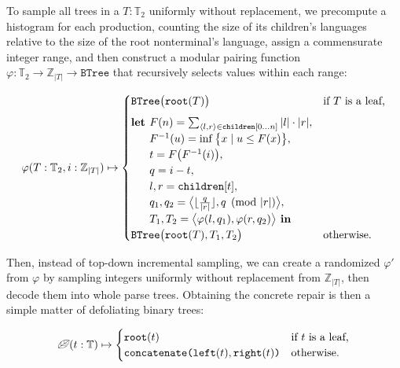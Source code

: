 \documentclass[sigplan,acmsmall,nonacm,screen]{acmart}\settopmatter{printfolios=false,printccs=false,printacmref=false}
\begin{document}
To sample all trees in a $T: \mathbb{T}_2$ uniformly without replacement, we precompute a histogram for each production, counting the size of its children's languages relative to the size of the root nonterminal's language, assign a commensurate integer range, and then construct a modular pairing function $\varphi: \mathbb{T}_2 \rightarrow \mathbb{Z}_{|T|} \rightarrow \texttt{BTree}$ that recursively selects values within each range:

\begin{equation}\label{eq:pairing}
  \varphi(T: \mathbb{T}_2, i: \mathbb{Z}_{|T|}) \mapsto \begin{cases}
  \texttt{BTree}\big(\texttt{root}(T)\big) & \text{if $T$ is a leaf,} \vspace{5pt}\\
  \textbf{let } F(n) = \sum_{\langle l, r\rangle \in \texttt{children}[0 \ldots n]}|l|\cdot|r|,\\
  \phantom{\textbf{let }} F^{-1}(u) = \inf \big\{x \mid u \leq F(x)\big\},\\
  \phantom{\textbf{let }} t = F\big(F^{-1}(i)\big),\\
  \phantom{\textbf{let }} q = i - t,\\
  \phantom{\textbf{let }} l, r = \texttt{children}[t],\\
  \phantom{\textbf{let }} q_1, q_2 = \big\langle\lfloor\frac{q}{|r|}\rfloor, q \pmod{|r|}\big\rangle,\\
  \phantom{\textbf{let }} T_1, T_2 = \big\langle\varphi(l, q_1), \varphi(r, q_2)\big\rangle \textbf{ in } \\
  \texttt{BTree}\big(\texttt{root}(T), T_1, T_2\big) & \text{otherwise.} \\
  \end{cases}
\end{equation}

Then, instead of top-down incremental sampling, we can create a randomized $\varphi'$ from $\varphi$ by sampling integers uniformly without replacement from $\mathbb{Z}_{|T|}$, then decode them into whole parse trees. Obtaining the concrete repair is then a simple matter of defoliating binary trees:

\begin{equation}
\text{\textleaf}(t: \mathbb{T}) \mapsto \begin{cases}
\texttt{root}(t) & \text{if $t$ is a leaf,} \\
\texttt{concatenate(left}(t), \texttt{right}(t)\texttt{)} & \text{otherwise.}
\end{cases}
\end{equation}
\end{document}
